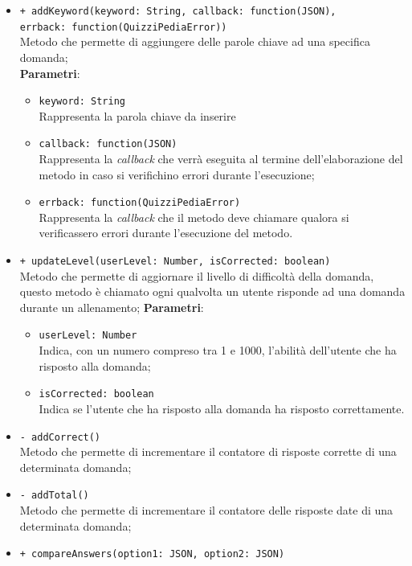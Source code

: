 \begin{itemize}
\begin{itemize}
\begin{itemize}
		\end{itemize}
	\item \texttt{+ addKeyword(keyword: String, callback: function(JSON),\\ errback: function(QuizziPediaError))} \\
	Metodo che permette di aggiungere delle parole chiave ad una specifica domanda; \\
		\textbf{Parametri}:
			 \begin{itemize}
			 	\item \texttt{keyword: String} \\
			 	Rappresenta la parola chiave da inserire
			 	\item \texttt{callback: function(JSON)} \\
			 	Rappresenta la \textit{callback} che verrà eseguita al termine dell'elaborazione del metodo in caso si verifichino errori durante l'esecuzione;
			 	\item \texttt{errback: function(QuizziPediaError)} \\
			 	Rappresenta la \textit{callback} che il metodo deve chiamare qualora si verificassero errori durante l'esecuzione del metodo.
			 \end{itemize}
	\item \texttt{+ updateLevel(userLevel: Number, isCorrected: boolean)} \\
	Metodo che permette di aggiornare il livello di difficoltà della domanda, questo metodo è chiamato ogni qualvolta un utente risponde ad una domanda durante un allenamento;
		\textbf{Parametri}:
			\begin{itemize}
				\item \texttt{userLevel: Number} \\
				Indica, con un numero compreso tra 1 e 1000, l'abilità dell'utente che ha risposto alla domanda;
				\item \texttt{isCorrected: boolean} \\
				Indica se l'utente che ha risposto alla domanda ha risposto correttamente.
			\end{itemize}  
	\item \texttt{- addCorrect()} \\
	Metodo che permette di incrementare il contatore di risposte corrette di una determinata domanda;
	\item \texttt{- addTotal()} \\
	Metodo che permette di incrementare il contatore delle risposte date di una determinata domanda;
	\item \texttt{+ compareAnswers(option1: JSON, option2: JSON)}

\end{itemize}
\end{itemize}
